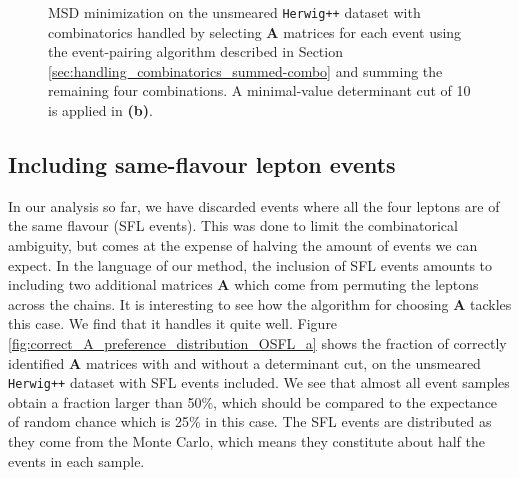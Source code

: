 \documentclass[twoside,english]{uiofysmaster}
\begin{document}
\begin{figure}[hbtp!]
\begin{subfigure}[b]{0.45\textwidth}
		\caption{ }
		\label{fig:event-pair-A-selection_4combosum_b} 
	\end{subfigure}
	\caption{MSD minimization on the unsmeared {\tt Herwig++} dataset with combinatorics handled by selecting $\mathbf{A}$ matrices for each event using the event-pairing algorithm described in Section \ref{sec:handling_combinatorics_summed-combo} and summing the remaining four combinations. A minimal-value determinant cut of 10 is applied in {\bf (b)}.}
	\label{fig:event-pair-A-selection_4combosum}
\end{figure}

\subsection{Including same-flavour lepton events}
In our analysis so far, we have discarded events where all the four leptons are of the same flavour (SFL events). This was done to limit the combinatorical ambiguity, but comes at the expense of halving the amount of events we can expect. In the language of our method, the inclusion of SFL events amounts to including two additional matrices $\mathbf{A}$ which come from permuting the leptons across the chains. It is interesting to see how the algorithm for choosing $\mathbf{A}$ tackles this case. We find that it handles it quite well. Figure \ref{fig:correct_A_preference_distribution_OSFL_a} shows the fraction of correctly identified $\mathbf{A}$ matrices with and without a determinant cut, on the unsmeared {\tt Herwig++} dataset with SFL events included. We see that almost all event samples obtain a fraction larger than 50\%, which should be compared to the expectance of random chance which is 25\% in this case. The SFL events are distributed as they come from the Monte Carlo, which means they constitute about half the events in each sample.
\end{document}
